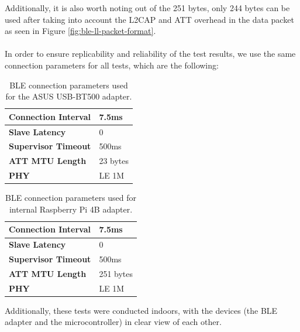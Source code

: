 Additionally, it is also worth noting out of the 251 bytes, only 244 bytes can be used after taking into account the \acs{L2CAP} and \acs{ATT} overhead in the data packet as seen in Figure \ref{fig:ble-ll-packet-format}.

\paragraph{} In order to ensure replicability and reliability of the test results, we use the same connection parameters for all tests, which are the following:

\begin{table}[H]
    \centering
    \caption{\acs{BLE} connection parameters used for the ASUS USB-BT500 adapter.}
    \begin{tabular}{|l|l|}
    \hline
    \textbf{Connection Interval} & 7.5ms \\ \hline
    \textbf{Slave Latency}       & 0     \\ \hline
    \textbf{Supervisor Timeout}  & 500ms \\ \hline
    \textbf{\acs{ATT} \acs{MTU} Length}      & 23 bytes   \\ \hline
    \textbf{\acs{PHY}}      & LE 1M   \\ \hline
    
    \end{tabular}
    \label{tab:ble-connection-values-hci1}
\end{table}

\begin{table}[H]
    \centering
    \caption{\acs{BLE} connection parameters used for internal Raspberry Pi 4B adapter.}
    \begin{tabular}{|l|l|}
    \hline
    \textbf{Connection Interval} & 7.5ms \\ \hline
    \textbf{Slave Latency}       & 0     \\ \hline
    \textbf{Supervisor Timeout}  & 500ms \\ \hline
    \textbf{\acs{ATT} \acs{MTU} Length}      & 251 bytes   \\ \hline
    \textbf{\acs{PHY}}      & LE 1M   \\ \hline
    \end{tabular}
    \label{tab:ble-connection-values-hci0}
\end{table}

Additionally, these tests were conducted indoors, with the devices (the \acs{BLE} adapter and the microcontroller) in clear view of each other.

